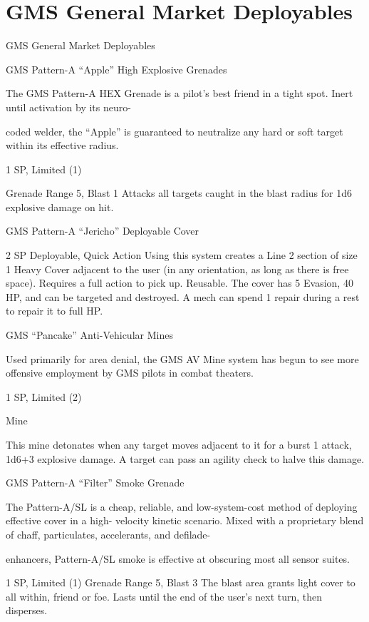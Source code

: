\section{GMS General Market Deployables}
                               GMS General Market Deployables

GMS Pattern-A “Apple” High Explosive Grenades

The GMS Pattern-A HEX Grenade is a pilot’s best friend in a tight spot. Inert until activation by its neuro-

coded welder, the “Apple” is guaranteed to neutralize any hard or soft target within its effective radius.


1 SP, Limited (1)

Grenade
Range 5, Blast 1
Attacks all targets caught in the blast radius for 1d6 explosive damage on hit.


GMS Pattern-A “Jericho”  Deployable Cover

2 SP
Deployable, Quick Action
Using this system creates a Line 2 section of size 1 Heavy Cover adjacent to the user (in any
orientation, as long as there is free space). Requires a full action to pick up. Reusable. The cover
has 5 Evasion, 40 HP, and can be targeted and destroyed. A mech can spend 1 repair during a
rest to repair it to full HP.


GMS “Pancake” Anti-Vehicular Mines




Used primarily for area denial, the GMS AV Mine system has begun to see more offensive employment by
GMS pilots in combat theaters.

1 SP, Limited (2)

Mine

This mine detonates when any target moves adjacent to it for a burst 1 attack, 1d6+3 explosive
damage. A target can pass an agility check to halve this damage.


GMS Pattern-A “Filter” Smoke Grenade

The Pattern-A/SL is a cheap, reliable, and low-system-cost method of deploying effective cover in a high-
velocity kinetic scenario. Mixed with a proprietary blend of chaff, particulates, accelerants, and defilade-

enhancers, Pattern-A/SL smoke is effective at obscuring most all sensor suites.

1 SP, Limited (1)
Grenade
Range 5, Blast 3
The blast area grants light cover to all within, friend or foe. Lasts until the end of the user’s next
turn, then disperses.